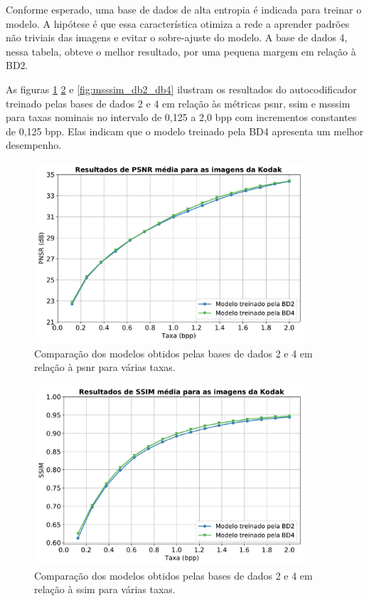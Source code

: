 Conforme esperado, uma base de dados de alta entropia é indicada para treinar o modelo. A hipótese é que essa característica otimiza a rede a aprender padrões não triviais das imagens e evitar o sobre-ajuste do modelo. A base de dados 4, nessa tabela, obteve o melhor resultado, por uma pequena margem em relação à BD2.

As figuras \ref{fig:psnr_db2_db4} \ref{fig:ssim_db2_db4} e \ref{fig:msssim_db2_db4} ilustram os resultados do autocodificador treinado pelas bases de dados 2 e 4 em relação às métricas \acrshort{psnr}, \acrshort{ssim} e \acrshort{msssim} para taxas nominais no intervalo de 0,125 a 2,0 bpp com incrementos constantes de 0,125 bpp. Elas indicam que o modelo treinado pela BD4 apresenta um melhor desempenho. 

\begin{figure}[H]
	\centering
	\includegraphics[width=0.9\textwidth]{figuras/psnr_db2_db4.pdf}
	\caption[Comparação dos resultados das bases de dados 2 e 4 em relação à \acrshort{psnr}]{Comparação dos modelos obtidos pelas bases de dados 2 e 4 em relação à \acrshort{psnr} para várias taxas.} 
	\label{fig:psnr_db2_db4}
\end{figure}

\begin{figure}[H]
	\centering
	\includegraphics[width=0.9\textwidth]{figuras/ssim_db2_db4.pdf}
	\caption[Comparação dos resultados das bases de dados 2 e 4 em relação à \acrshort{ssim}]{Comparação dos modelos obtidos pelas bases de dados 2 e 4 em relação à \acrshort{ssim} para várias taxas.} 
	\label{fig:ssim_db2_db4}
\end{figure}

